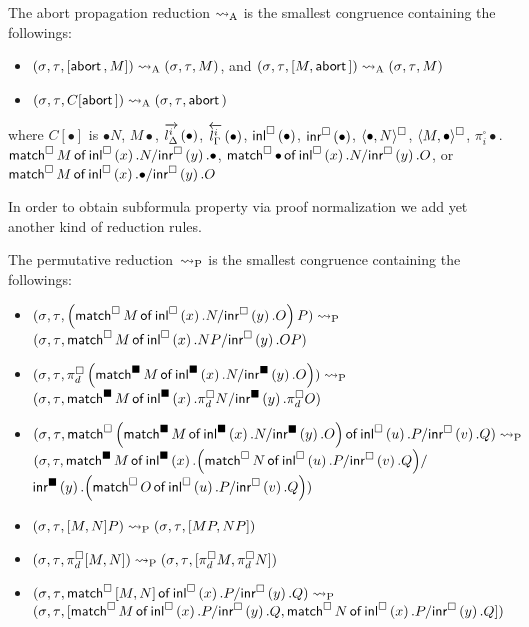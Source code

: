\begin{definition}
 The abort propagation reduction $\areduce$ is the smallest
 congruence containing the
 followings:
\begin{itemize}
 \item  $\conf{}{}{\cotuple{\abort, M}}\areduce
 \conf{}{}{M}$, and
   $\conf{}{}{\cotuple{M,\abort}}\areduce
 \conf{}{}{M}$
 \item  $\conf{}{}{C[\abort]}\areduce
 \conf{}{}{\abort}$
\end{itemize}
 where $C[\bullet]$ is 
$\bullet N$, 
${M \bullet}$,
$\ltor i l \Delta \bullet$,
$\rtol i l \Gamma \bullet$,
$\sinl \bullet$,
$\sinr \bullet$,
$\spair {\bullet, N}$,
$\spair {M, \bullet}$,
$\pi^\square_i \bullet$.
$\smat M x N y \bullet$,
$\smat  \bullet x N y O$, or  \\
$\smat  M x \bullet y O$ 
\end{definition}
In order to obtain subformula property
 via proof normalization
we add yet another kind of reduction rules.
\begin{definition}
 The permutative reduction~$\preduce$ is the smallest congruence
 containing the followings:
\begin{itemize}
 \small
 \item $\conf{}{}{ \left(\smat  M x N y O\right) P }\preduce$ \\
       $\conf{}{}{ \smat M x {N P} y {O P} }$
 \item $\conf{}{}{ \pi^\square_d \left(\bsmat M x N y
       O\right)}\preduce$\\
       $\conf{}{}{ \bsmat M x
       {\pi^\square_d N} y {\pi^\square_d O} }$
 \item {
       $\conf{}{}{ \smat
                          {\left(\bsmat  M x N y O\right)}
                          u P v Q
                      }\preduce$ \\
       $(\lstore, \rstore, 
        \mathsf{match}^{\blacksquare}\,{M}\,\mathsf{of}\, \bsinl{x}. {
                          {\left(\smat N u P v Q\right)}
       } /$ \\ \phantom{mmmmmmmmmmm}$
       \bsinr{y}. {\left(\smat  O u P v Q\right)}
                      )
       $}
 \item $\conf{}{}{ \cotuple{M, N} P }\preduce
        \conf{}{}{ \cotuple{MP, NP} }$
 \item $\conf{}{}{ \pi^\square_d\cotuple{M,N} }\preduce
        \conf{}{}{ \cotuple{\pi^\square_d M, \pi^\square_d N} }$
 \item $\conf{}{}{ \smat {\cotuple{M,N}} x P y Q }\preduce$\\
       $\conf{}{}{ \cotuple{
                          \smat  M x P y Q,
                          \smat N x P y Q
                        } }$
\end{itemize}
\end{definition}

